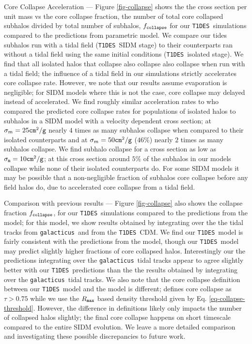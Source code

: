 \documentclass[%
 reprint,
 amsmath,
 amssymb,
 aps,
]{revtex4-2}
\def\gal{{\tt galacticus}~}
\def\tides{{\tt T1DES}~}
\newcommand{\reffig}[1]{Figure \ref{#1}}
\newcommand{\refeq}[1]{Eq. \ref{#1}}
\begin{document}
Core Collapse Acceleration ---  \reffig{fig-collapse} shows the the cross section per unit mass vs the core collapse fraction, the number of total core collapsed subhalos divided by total number of subhalos, $f_{\tt collapse}$  for our \tides simulations compared to the predictions from \cite{yang2024parametric} parametric model.
We compare our tides subhalos run with a tidal field (\tides SIDM stage) to their counterparts ran without a tidal field using the same initial conditions (\tides isolated stage). 
We find that all isolated halos that collapse also collapse also collapse when run with a tidal field; the influence of a tidal field in our simulations strictly accelerates core collapse rate.  
However, we note that our results assume evaporation is negligible; for SIDM models where this is not the case, core collapse may delayed instead of accelerated.
We find roughly similar acceleration rates to \citet{nadler2025sidm} who compared the predicted core collapse rates for populations of isolated halos to subhalos in a SIDM model with a velocity dependent cross section; at $\sigma_{m} = 25 {\tt cm^2 / g}$ nearly $4$ times as many subhalos collapse when compared to their isolated counterparts and at $\sigma_{m} = 50 {\tt cm^2 / g}$ ($46\%$) nearly $2$ times as many subhalos collapse. 
We find subhalo collapse for a cross section as low as $\sigma_{\tt m} = 10 {\tt cm^2 / g}$; at this cross section around $5\%$ of the subhalos in our models collapse while none of their isolated counterparts do. 
For some SIDM models it may be possible that a non-negligible fraction of subhalos core collapse before any field halos do, due to accelerated core collapse from a tidal field. 


Comparison with previous results --- 
\reffig{fig-collapse} also shows the collapse fraction $f_{\tt collapse}$, for our \tides simulations compared to the predictions from the \citet{yang2024parametric} model; for this model, we show results obtained by integrating over the the tidal tracks from \gal  and from the \tides CDM. 
We find our \tides model is fairly consistent with the predictions from the \citet{yang2024parametric} model, though our \tides model may predict slightly higher fractions of core collapsed halos. 
Interestingly our the \citet{yang2024parametric} predictions integrating over the \gal tidal tracks appear to agree slightly better with our \tides predictions than the the results obtained by integrating over the \gal tidal tracks.
We also note that the core collapse definition between our \tides model and the \citet{yang2024parametric} model is different; \citet{yang2024parametric} defines core collapse as $\tau > 0.75$ while we use the $R_{\tt max}$ based density threshold given by \refeq{eq-collapse-threshold}.
However, the difference in definitions likely only impacts the number of collapsed halos slightly; the final core collapse happens on short timescale compared to the entire SIDM evolution.
We leave a more detailed comparison and investigating these possible discrepancies to future work.
\end{document}
